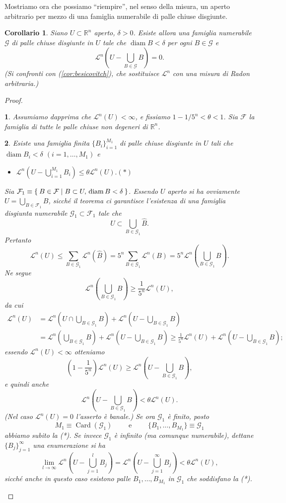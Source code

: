 \documentclass[a4paper,10pt,openright,oneside]{book}
\theoremstyle{theoremstyle}
\newtheorem{corollario}[teorema]{Corollario}
\theoremstyle{theoremstylewoheader}
\theoremstyle{theoremstyle}
\theoremstyle{proofsecstyle}
\newtheorem{proofsec}{}
\theoremstyle{nonumberplain}
\newtheorem{proof}{Dim.}
\newcommand{\FF}{\ensuremath{\mathcal{F}}}
\newcommand{\GG}{\ensuremath{\mathcal{G}}}
\newcommand{\RR}{\ensuremath{\mathbb{R}}}
\newcommand{\Leb}{\ensuremath{\mathcal{L}}}
\DeclareMathOperator{\diam}{diam}
\DeclareMathOperator{\Card}{Card}
\newcommand{\mymath}[2]{\begin{itemize}%
  \item[]\hfill\hbox{}\ensuremath{\displaystyle #1}\hfill\ensuremath{\displaystyle #2}%
  \end{itemize}}
\begin{document}
\noindent Mostriamo ora che possiamo ``riempire'', nel senso della misura, un aperto arbitrario per mezzo di una famiglia numerabile di palle chiuse disgiunte.

\begin{corollario}
\label{cor:vitali_2}
Siano $U \subset \RR^n$ aperto, $\delta > 0$. Esiste allora una famiglia numerabile $\GG$ di palle chiuse disgiunte in $U$ tale che $\diam B < \delta$ per ogni $B \in \GG$ e
\[
\Leb^n\left(U - \bigcup_{B \in \GG} B\right) = 0.
\]
(Si confronti con (\ref{cor:besicovitch}), che sostituisce $\Leb^n$ con una misura di Radon arbitraria.)
\end{corollario}

\begin{proof}
\begin{proofsec}
Assumiamo dapprima che $\Leb^n(U) < \infty$, e fissiamo $1 - 1/5^n < \theta < 1$. Sia $\FF$ la famiglia di \emph{tutte} le palle chiuse non degeneri di $\RR^n$.
\end{proofsec}

\begin{proofsec}
\emph{Esiste una famiglia finita $\{B_i\}_{i=1}^{M_1}$ di palle chiuse disgiunte in $U$ tali che $\diam B_i < \delta$ $(i = 1, \ldots, M_1)$ e} \mymath{\Leb^n\left(U - \bigcup_{i=1}^{M_1} B_i\right) \le \theta\Leb^n(U).}{(*)} Sia $\FF_1 \equiv \Set{ B \in \FF | B \subset U,\, \diam B < \delta }$. Essendo $U$ aperto si ha ovviamente $U = \bigcup_{B \in \FF_1} B$, sicché il teorema ci garantisce l'esistenza di una famiglia disgiunta numerabile $\GG_1 \subset \FF_1$ tale che
\[
U \subset \bigcup_{B \in \GG_1} \hat{B}.
\]
Pertanto
\[
\Leb^n(U) \le \sum_{B \in \GG_1} \Leb^n(\hat{B}) = 5^n \sum_{B \in \GG_1} \Leb^n(B) = 5^n \Leb^n \left(\bigcup_{B \in \GG_1} B\right).
\]
Ne segue
\[
\Leb^n \left(\bigcup_{B \in \GG_1} B\right) \ge \frac{1}{5^n} \Leb^n (U),
\]
da cui
\begin{align*}
\Leb^n(U) &= \Leb^n \left(U \cap \bigcup_{B \in \GG_1} B\right) + \Leb^n \left(U - \bigcup_{B \in \GG_1} B\right)\\
&= \Leb^n \left(\bigcup_{B \in \GG_1} B\right) + \Leb^n \left(U - \bigcup_{B \in \GG_1} B\right) \ge \frac{1}{5^n} \Leb^n(U) + \Leb^n \left(U - \bigcup_{B \in \GG_1} B\right);
\end{align*}
essendo $\Leb^n(U) < \infty$ otteniamo
\[
\left(1 - \frac{1}{5^n}\right) \Leb^n (U) \ge \Leb^n \left(U - \bigcup_{B \in \GG_1} B\right),
\]
e quindi anche
\[
\Leb^n \left(U - \bigcup_{B \in \GG_1} B\right) < \theta\Leb^n(U).
\]
(Nel caso $\Leb^n(U) = 0$ l'asserto è banale.) Se ora $\GG_1$ è finito, posto
\[
M_1 \equiv \Card(\GG_1) \qquad\text{ e }\qquad \{B_1, \ldots, B_{M_1}\} \equiv \GG_1
\]
abbiamo subito la (*). Se invece $\GG_1$ è infinito (ma comunque numerabile), dettane $\{B_j\}_{j=1}^\infty$ una enumerazione si ha
\[
\lim_{l \to \infty} \Leb^n \left(U - \bigcup_{j=1}^l B_j\right) = \Leb^n \left(U - \bigcup_{j=1}^\infty B_j\right) < \theta\Leb^n(U),
\]
sicché anche in questo caso esistono palle $B_1, \ldots, B_{M_1}$ in $\GG_1$ che soddisfano la (*).
\end{proofsec}


\end{proof}
\end{document}
